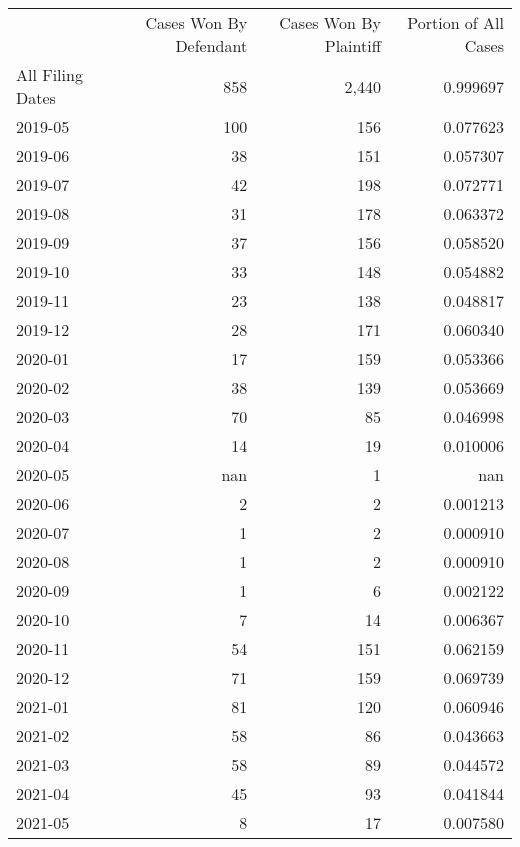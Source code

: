 \begin{tabular}{lrrr}
 & Cases Won By Defendant & Cases Won By Plaintiff & Portion of All Cases \\
All Filing Dates & 858 & 2,440 & 0.999697 \\
2019-05 & 100 & 156 & 0.077623 \\
2019-06 & 38 & 151 & 0.057307 \\
2019-07 & 42 & 198 & 0.072771 \\
2019-08 & 31 & 178 & 0.063372 \\
2019-09 & 37 & 156 & 0.058520 \\
2019-10 & 33 & 148 & 0.054882 \\
2019-11 & 23 & 138 & 0.048817 \\
2019-12 & 28 & 171 & 0.060340 \\
2020-01 & 17 & 159 & 0.053366 \\
2020-02 & 38 & 139 & 0.053669 \\
2020-03 & 70 & 85 & 0.046998 \\
2020-04 & 14 & 19 & 0.010006 \\
2020-05 & nan & 1 & nan \\
2020-06 & 2 & 2 & 0.001213 \\
2020-07 & 1 & 2 & 0.000910 \\
2020-08 & 1 & 2 & 0.000910 \\
2020-09 & 1 & 6 & 0.002122 \\
2020-10 & 7 & 14 & 0.006367 \\
2020-11 & 54 & 151 & 0.062159 \\
2020-12 & 71 & 159 & 0.069739 \\
2021-01 & 81 & 120 & 0.060946 \\
2021-02 & 58 & 86 & 0.043663 \\
2021-03 & 58 & 89 & 0.044572 \\
2021-04 & 45 & 93 & 0.041844 \\
2021-05 & 8 & 17 & 0.007580 \\
\end{tabular}
